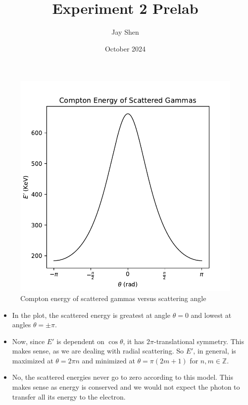 \documentclass[12pt, letterpaper]{article}
\title{Experiment 2 Prelab}
\author{Jay Shen}
\date{October 2024}
\begin{document}
\maketitle

\begin{figure}[h]
    \centering
    \includegraphics[width=0.5\linewidth]{experiment2/figures/compton_energy.pdf}
    \caption{Compton energy of scattered gammas versus scattering angle}
    \label{fig:compton}
\end{figure}

\begin{itemize}
    \item {
        In the plot, the scattered energy is greatest at angle $\theta=0$ and lowest at angles $\theta=\pm \pi$. 
    }
    \item {
        Now, since $E'$ is dependent on $\cos \theta$, it has $2\pi$-translational symmetry. This makes sense, as we are dealing with radial scattering. So $E'$, in general, is maximized at $\theta=2\pi n$ and minimized at $\theta=\pi (2m + 1)$ for $n, m\in \mathbb{Z}$. 
    }
    \item {
        No, the scattered energies never go to zero according to this model. This makes sense as energy is conserved and we would not expect the photon to transfer all its energy to the electron. 
    }
\end{itemize}
\end{document}
